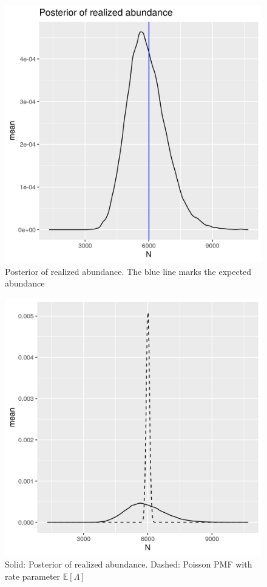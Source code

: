 \documentclass[preprint,12pt]{elsarticle}
\begin{document}
\begin{figure}
	\includegraphics[scale=0.6]{figures/realized_abundance_posterior.png}
	\caption{Posterior of realized abundance.  The blue line marks the expected abundance}
	\label{fig:realized-abundance-posterior}
\end{figure}

\begin{figure}
	\includegraphics[scale=0.6]{figures/realized_abundance_vs_exp.png}
	\caption{Solid:  Posterior of realized abundance.  Dashed:  Poisson PMF with rate parameter $\mathbb{E}[\Lambda]$}
	\label{fig:realized-abundance-comparison}
\end{figure}
\end{document}
